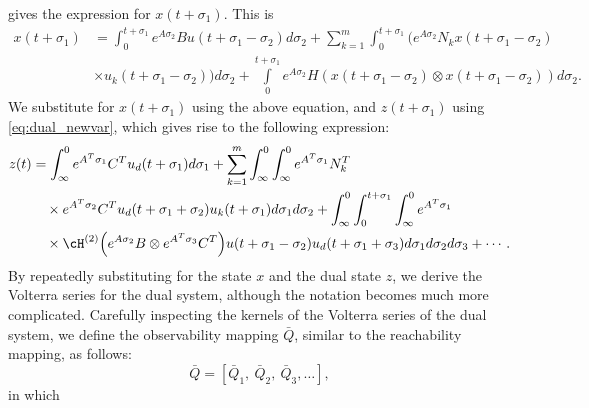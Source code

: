  gives the expression for $x(t+\sigma_1)$. This is
\begin{equation*}
\begin{aligned}
  x(t+\sigma_1) &= \int_0^{t+\sigma_1} e^{A\sigma_2}Bu(t+\sigma_1-\sigma_2)d\sigma_2 + \sum_{k=1}^m\int_0^{t+\sigma_1} \Big( e^{A\sigma_2}N_kx(t+\sigma_1-\sigma_2)  \\ 
  &   \times  u_k(t+\sigma_1-\sigma_2) \Big)d\sigma_2 + \int\limits_0^{t+\sigma_1} e^{A\sigma_2}H(x(t+\sigma_1-\sigma_2)\otimes x(t+\sigma_1-\sigma_2))d\sigma_2.
  \end{aligned}
\end{equation*}
We substitute for $x(t+\sigma_1)$ using the above equation, and $z(t+\sigma_1)$ using \eqref{eq:dual_newvar}, which gives rise to the following expression:
\begin{equation}\label{eq:sys_dual}
 \begin{aligned}
   z(t) &= \int_{\infty}^0 e^{A^T\sigma_1}C^T u_d(t+\sigma_1)d\sigma_1   +\sum_{k=1}^m  \int_{\infty}^0\int_{\infty}^0 e^{A^T\sigma_1}N_k^T \\ 
   &\quad \times e^{A^T\sigma_2}C^T u_d(t+\sigma_1+\sigma_2)u_k(t+\sigma_1)d\sigma_1d\sigma_2 + \int_{\infty}^0\int_0^{t+\sigma_1}\int_{\infty}^{0} e^{A^T\sigma_1} \\ 
   &\quad \times \cH^{(2)}\Big( e^{A\sigma_2}B\otimes e^{A^T\sigma_3}C^T \Big) u(t+\sigma_1-\sigma_2)u_d(t+\sigma_1+\sigma_3)d\sigma_1d\sigma_2d\sigma_3  + \cdots.
 \end{aligned}
\end{equation}
By repeatedly substituting  for the state $x$ and the dual state $z$, we derive the Volterra series for the dual system,
although the notation becomes much more complicated.  Carefully inspecting the kernels of the Volterra series of the dual system, we define the observability mapping $\bar Q$, similar to the  reachability mapping, as follows:
\begin{equation}\label{eq:obser_mapping}
 \bar{Q} = [ \bar Q_1,~\bar Q_2,~ \bar Q_3,\ldots],
\end{equation}
in which
